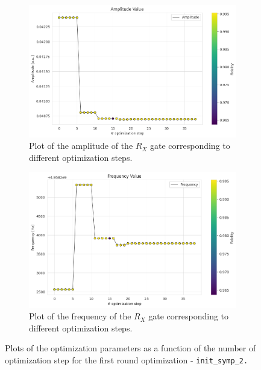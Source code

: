 \begin{figure}[h!]
    \centering
    \begin{subfigure}[t]{0.45\textwidth}
        \includegraphics[width=\textwidth]{figures/png/RB_optimization/NM/InitialSymplex/20241110_211211/amplitude.png}
        \caption{Plot of the amplitude of the $R_X$ gate corresponding to different optimization steps.}
        \label{fig:20241110_211211:amplitude}
    \end{subfigure}
    \hfill
    \begin{subfigure}[t]{0.45\textwidth}
        \includegraphics[width=\textwidth]{figures/png/RB_optimization/NM/InitialSymplex/20241110_211211/frequency.png}
        \caption{Plot of the frequency of the $R_X$ gate corresponding to different optimization steps.}
        \label{fig:20241110_211211:frequency}
    \end{subfigure}
    \caption{Plots of the optimization parameters as a function of the number of optimization step for the first round optimization - \tt{init\_symp\_2}.}
    \label{fig:20241110_211211:parameters}
\end{figure}

